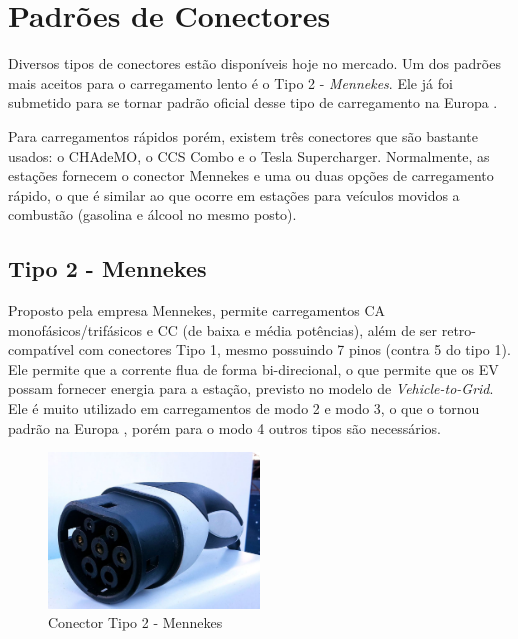   \section{Padrões de Conectores}
  \label{stateofart:plugs}

      Diversos tipos de conectores estão disponíveis hoje no mercado. Um dos padrões mais aceitos para o carregamento lento é o Tipo 2 - \textit{Mennekes}. Ele já foi submetido para se tornar padrão oficial desse tipo de carregamento na Europa \cite{mckinsey-report-ev}.

      Para carregamentos rápidos porém, existem três conectores que são bastante usados: o CHAdeMO, o CCS Combo e o Tesla Supercharger. Normalmente, as estações fornecem o conector Mennekes e uma ou duas opções de carregamento rápido, o que é similar ao que ocorre em estações para veículos movidos a combustão (gasolina e álcool no mesmo posto).

      \subsection{Tipo 2 - Mennekes}
      \label{stateofart:plugs:mennekes}

        Proposto pela empresa Mennekes, permite carregamentos \ac{CA} monofásicos/trifásicos e \ac{CC} (de baixa e média potências), além de ser retro-compatível com conectores Tipo 1, mesmo possuindo 7 pinos (contra 5 do tipo 1). Ele permite que a corrente flua de forma bi-direcional, o que permite que os \ac{EV} possam fornecer energia para a estação, previsto no modelo de \textit{Vehicle-to-Grid}. Ele é muito utilizado em carregamentos de modo 2 e modo 3, o que o tornou padrão na Europa \cite{mennekes-news-standardplug}, porém para o modo 4 outros tipos são necessários.

        \begin{figure}[H]
          \begin{center}
            \includegraphics[width=0.50\textwidth,natwidth=1024,natheight=755]{assets/images/connectors-mennekes.jpg}
            \caption{Conector Tipo 2 - Mennekes}
            \label{fig:mennekes}
          \end{center}
        \end{figure}


